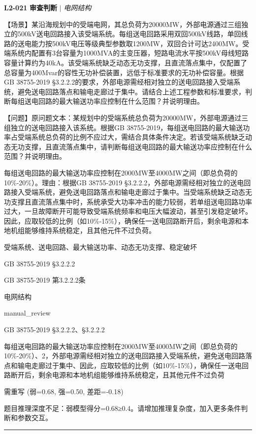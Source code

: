 \documentclass[11pt,a4paper]{ctexart}
\begin{document}
\noindent\textbf{L2-021} \hfill \textbf{审查判断} $|$ \textit{电网结构}
\begin{description}[leftmargin=1.5em,style=nextline,font=\normalfont]
  \item[Q:] 【场景】某沿海规划中的受端电网，其总负荷为20000MW，外部电源通过三组独立的500kV送电回路接入该受端系统。每组送电回路采用双回500kV线路，单回线路的送电能力按500kV电压等级典型参数取1200MW，双回合计可达2400MW。受端系统内配置有3台容量为1000MVA的主变压器，短路电流水平按500kV母线短路容量计算约为40kA。该受端系统缺乏动态无功支撑，且直流落点集中，仅配置了总容量为400Mvar的容性无功补偿装置，远低于标准要求的无功补偿容量。根据GB 38755-2019 §3.2.2.2的要求，外部电源需经相对独立的送电回路接入受端系统，避免送电回路落点和输电走廊过于集中。请结合上述工程参数和标准要求，判断每组送电回路的最大输送功率应控制在什么范围？并说明理由。

【问题】原问题文本：某规划中的受端系统总负荷为20000MW，外部电源通过三组独立的送电回路接入该系统。根据GB 38755-2019，每组送电回路的最大输送功率占受端系统总负荷的比例不应过大，需结合具体条件决定。若该受端系统缺乏动态无功支撑，且直流落点集中，请判断每组送电回路的最大输送功率应控制在什么范围？并说明理由。
  \item[A:] 每组送电回路的最大输送功率应控制在2000MW至4000MW之间（即总负荷的10\%-20\%）。理由：根据GB 38755-2019 §3.2.2.2，外部电源需经相对独立的送电回路接入受端系统，避免送电回路落点和输电走廊过于集中。当受端系统缺乏动态无功支撑且直流落点集中时，系统承受大功率冲击的能力较弱，若单组送电回路功率过大，一旦故障断开可能导致受端系统频率和电压大幅波动，甚至引发稳定破坏。因此，应取较低的比例（如10\%-15\%），确保任一送电回路断开后，剩余电源和本地机组能够维持系统稳定，且其他元件不过负荷。
  \item[KW:] 受端系统、送电回路、最大输送功率、动态无功支撑、稳定破坏
  \item[标准:] GB 38755-2019 §3.2.2.2
  \item[条款溯源:] GB 38755-2019 第3.2.2.2条
  \item[主题:] 电网结构
  \item[评分方式:] manual\_review
  \item[Rubric条款:] GB 38755-2019 §3.2.2.2、§3.2.2.2
  \item[Rubric判据:] 每组送电回路的最大输送功率应控制在2000MW至4000MW之间（即总负荷的10\%-20\%）、2，外部电源需经相对独立的送电回路接入受端系统，避免送电回路落点和输电走廊过于集中、因此，应取较低的比例（如10\%-15\%），确保任一送电回路断开后，剩余电源和本地机组能够维持系统稳定，且其他元件不过负荷
  \item[LJ判定:] 需重写 (弱=0.68, 强=0.50, 差距=-0.18)
  \item[LJ反馈:] 题目推理深度不足：弱模型得分=0.68≥0.4。请增加推理复杂度，加入更多条件判断和参数交互。
\end{description}
\vspace{4pt}
\hrule
\vspace{6pt}
\end{document}

